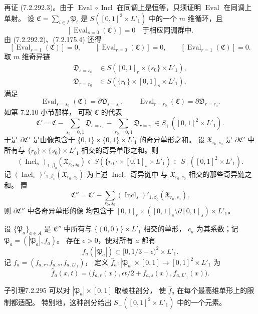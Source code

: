再证 (7.2.292.3)。由于
$\operatorname{Eval}\circ\operatorname{Incl}$
在同调上是恒等，只须证明
$\operatorname{Eval}$ 在同调上单射。
设 $\mathfrak C=\sum_{i\in I}\mathfrak P_i$
是 $S([0,1]^2\times L'_1)$ 中的一个
$m$ 维循环，且
\[
[\operatorname{Eval}_{s=0}(\mathfrak C)]=0
\quad\text{于相应同调群中}.
\]
由 (7.2.292.2)、(7.2.175.4) 还得
\[
[\operatorname{Eval}_{s=1}(\mathfrak C)]=0,
\qquad
[\operatorname{Eval}_{r=0}(\mathfrak C)]=0,
\qquad
[\operatorname{Eval}_{r=1}(\mathfrak C)]=0.
\]
取 $m$ 维奇异链
\[
\begin{aligned}
\mathfrak D_{s=s_0}&\in
S([0,1]_r\times\{s_0\}\times L'_1),\\
\mathfrak D_{r=r_0}&\in
S(\{r_0\}\times[0,1]_s\times L'_1),
\end{aligned}
\]
满足
\[
\operatorname{Eval}_{s=s_0}(\mathfrak C)
=\partial\mathfrak D_{s=s_0},
\qquad
\operatorname{Eval}_{r=r_0}(\mathfrak C)
=\partial\mathfrak D_{r=r_0}.
\]
如第 7.2.10 小节那样，
可取 $\mathfrak C$ 的代表
\[
\mathfrak C'
=\mathfrak C-
\sum_{s_0=0,1}\mathfrak D_{s=s_0}
-\sum_{r_0=0,1}\mathfrak D_{r=r_0}
\in S_+([0,1]^2\times L'_1).
\]
于是 $\partial\mathfrak C'$ 是由像包含于
$\{0,1\}\times\{0,1\}\times L'_1$
的奇异单形之和。
设 $\mathfrak X_{r_0,s_0}$ 是
$\partial\mathfrak C'$ 中所有与
$\{r_0\}\times\{s_0\}\times L'_1$
相交的奇异单形之和。则
\[
(\operatorname{Incl}_s)_{1,\beta_0}
(\mathfrak X_{r_0,s_0})
\in S(\{r_0\}\times[0,1]_s\times L'_1)
\subset S_+([0,1]^2\times L'_1).
\]
记
$(\operatorname{Incl}_s)'_{1,\beta_0}
(\mathfrak X_{r_0,s_0})$
为上述 $\operatorname{Incl}_s$ 奇异链中
与 $\mathfrak X_{r_0,s_0}$ 相交的那些奇异链之和。
置
\[
\mathfrak C''=\mathfrak C'
-\sum_{r_0,s_0}
(\operatorname{Incl}_s)'_{1,\beta_0}
(\mathfrak X_{r_0,s_0}).
\]
则 $\partial\mathfrak C''$ 中各奇异单形的像
均包含于
$[0,1]_r\times([0,1]_s\setminus
\partial[0,1]_s)\times L'_1$。

设 $\{\mathfrak P_a\}_{a\in A}$ 是
$\mathfrak C''$ 中所有与
$\{(0,0)\}\times L'_1$ 相交的单形，
$c_a$ 为其系数；记
$\mathfrak P_a=(|\mathfrak P_a|,f_a)$。
存在 $\epsilon>0$，使对所有 $a$ 都有
\[
f_a(|\mathfrak P_a|)
\subset[0,1/3-\epsilon)^2\times L'_1.
\]
记
$f_a=(f_{a,r},f_{a,s},f_{a,L'_1})$，
定义
$\widehat f_a\colon
|\mathfrak P_a|\times[0,1]
\to[0,1]^2\times L'_1$ 为
\begin{equation}
\widehat f_a(x,t)
=\bigl(f_{a,r}(x),
\epsilon t/2+f_{a,s}(x),
f_{a,L'_1}(x)\bigr).
\tag{7.2.294}\label{eq:7-2-294}
\end{equation}
\begin{statement}{子引理}{7.2.295}\label{sublem:7-2-295}
可以对 $|\mathfrak P_a|\times[0,1]$
取棱柱剖分，
使 $\widehat f_a$ 在每个最高维单形上的限制都适配。
特别地，这种剖分给出
$S_+([0,1]^2\times L'_1)$ 中的一个元素。
\end{statement}

